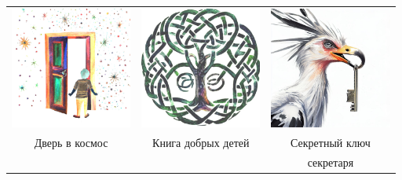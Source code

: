 \documentclass[a5paper,11pt]{memoir}
\begin{document}
\begin{table}[h]
\begin{tabular}{ccc}
\includegraphics[height=4cm]{images/cosmoroom} & \includegraphics[height=4cm]{images/tree-cover-one} & \includegraphics[height=4cm]{images/secretary-key-2}             \\
 Дверь в космос       &  Книга добрых детей    &     Секретный ключ  \\    
        &      &  секретаря    \\
\end{tabular}
\end{table}
\end{document}
